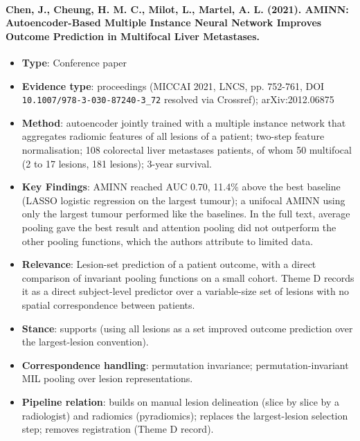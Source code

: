 \documentclass[journal,onecolumn]{IEEEtran}
\begin{document}
\paragraph{Chen, J., Cheung, H. M. C., Milot, L., Martel, A. L. (2021). AMINN: Autoencoder-Based Multiple Instance Neural Network Improves Outcome Prediction in Multifocal Liver Metastases.~\cite{Chen2021AMINN}}\mbox{}

\begin{itemize}

\item{} \textbf{Type}: Conference paper

\item{} \textbf{Evidence type}: proceedings (MICCAI 2021, LNCS, pp. 752-761, DOI \nolinkurl{10.1007/978-3-030-87240-3_72} resolved via Crossref); arXiv:2012.06875

\item{} \textbf{Method}: autoencoder jointly trained with a multiple instance network that aggregates radiomic features of all lesions of a patient; two-step feature normalisation; 108 colorectal liver metastases patients, of whom 50 multifocal (2 to 17 lesions, 181 lesions); 3-year survival.

\item{} \textbf{Key Findings}: AMINN reached AUC 0.70, 11.4\% above the best baseline (LASSO logistic regression on the largest tumour); a unifocal AMINN using only the largest tumour performed like the baselines. In the full text, average pooling gave the best result and attention pooling did not outperform the other pooling functions, which the authors attribute to limited data.

\item{} \textbf{Relevance}: Lesion-set prediction of a patient outcome, with a direct comparison of invariant pooling functions on a small cohort. Theme D records it as a direct subject-level predictor over a variable-size set of lesions with no spatial correspondence between patients.

\item{} \textbf{Stance}: supports (using all lesions as a set improved outcome prediction over the largest-lesion convention).

\item{} \textbf{Correspondence handling}: permutation invariance; permutation-invariant MIL pooling over lesion representations.

\item{} \textbf{Pipeline relation}: builds on manual lesion delineation (slice by slice by a radiologist) and radiomics (pyradiomics); replaces the largest-lesion selection step; removes registration (Theme D record).


\end{itemize}
\end{document}
